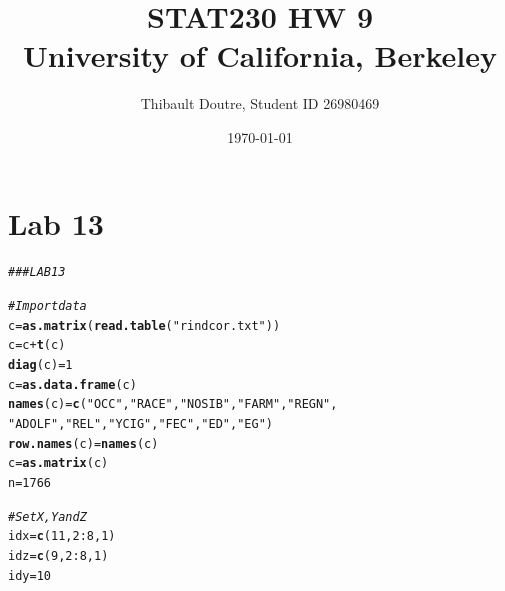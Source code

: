 \documentclass[11pt]{article}\usepackage[]{graphicx}\usepackage[]{color}
\author{Thibault Doutre, Student ID 26980469}
\title{STAT230 HW 9 \\
University of California, Berkeley}
\date{\today}
\makeatletter
\newcommand{\hlnum}[1]{\textcolor[rgb]{0.686,0.059,0.569}{#1}}%
\newcommand{\hlstr}[1]{\textcolor[rgb]{0.192,0.494,0.8}{#1}}%
\newcommand{\hlcom}[1]{\textcolor[rgb]{0.678,0.584,0.686}{\textit{#1}}}%
\newcommand{\hlopt}[1]{\textcolor[rgb]{0,0,0}{#1}}%
\newcommand{\hlstd}[1]{\textcolor[rgb]{0.345,0.345,0.345}{#1}}%
\newcommand{\hlkwb}[1]{\textcolor[rgb]{0.69,0.353,0.396}{#1}}%
\newcommand{\hlkwd}[1]{\textcolor[rgb]{0.737,0.353,0.396}{\textbf{#1}}}%
\newenvironment{kframe}{%
 \def\at@end@of@kframe{}%
 \ifinner\ifhmode%
  \def\at@end@of@kframe{\end{minipage}}%
  \begin{minipage}{\columnwidth}%
 \fi\fi%
 \def\FrameCommand##1{\hskip\@totalleftmargin \hskip-\fboxsep
 \colorbox{shadecolor}{##1}\hskip-\fboxsep
     \hskip-\linewidth \hskip-\@totalleftmargin \hskip\columnwidth}%
 \MakeFramed {\advance\hsize-\width
   \@totalleftmargin\z@ \linewidth\hsize
   \@setminipage}}%
 {\par\unskip\endMakeFramed%
 \at@end@of@kframe}
\newenvironment{knitrout}{}{} %
\makeatother
\begin{document}
\maketitle
\section{Lab 13}
\begin{knitrout}
\color{fgcolor}\begin{kframe}
\begin{alltt}
\hlcom{## # LAB 13}

\hlcom{# Import data}
\hlstd{c} \hlkwb{=} \hlkwd{as.matrix}\hlstd{(}\hlkwd{read.table}\hlstd{(}\hlstr{"rindcor.txt"}\hlstd{))}
\hlstd{c} \hlkwb{=} \hlstd{c}\hlopt{+}\hlkwd{t}\hlstd{(c)}
\hlkwd{diag}\hlstd{(c)} \hlkwb{=} \hlnum{1}
\hlstd{c} \hlkwb{=} \hlkwd{as.data.frame}\hlstd{(c)}
\hlkwd{names}\hlstd{(c)} \hlkwb{=} \hlkwd{c}\hlstd{(}\hlstr{"OCC"}\hlstd{,}\hlstr{"RACE"}\hlstd{,}\hlstr{"NOSIB"}\hlstd{,}\hlstr{"FARM"}\hlstd{,}\hlstr{"REGN"}\hlstd{,}
                   \hlstr{"ADOLF"}\hlstd{,}\hlstr{"REL"}\hlstd{,}\hlstr{"YCIG"}\hlstd{,}\hlstr{"FEC"}\hlstd{,}\hlstr{"ED"}\hlstd{,}\hlstr{"EG"}\hlstd{)}
\hlkwd{row.names}\hlstd{(c)} \hlkwb{=} \hlkwd{names}\hlstd{(c)}
\hlstd{c} \hlkwb{=} \hlkwd{as.matrix}\hlstd{(c)}
\hlstd{n} \hlkwb{=} \hlnum{1766}

\hlcom{# Set X, Y and Z}
\hlstd{idx} \hlkwb{=} \hlkwd{c}\hlstd{(}\hlnum{11}\hlstd{,}\hlnum{2}\hlopt{:}\hlnum{8}\hlstd{,}\hlnum{1}\hlstd{)}
\hlstd{idz} \hlkwb{=} \hlkwd{c}\hlstd{(}\hlnum{9}\hlstd{,}\hlnum{2}\hlopt{:}\hlnum{8}\hlstd{,}\hlnum{1}\hlstd{)}
\hlstd{idy} \hlkwb{=} \hlnum{10}


\end{alltt}
\end{kframe}
\end{knitrout}
\end{document}
